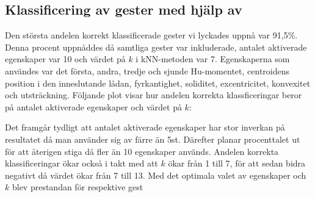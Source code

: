 \documentclass[../rapport_MVEX01-11-05]{subfiles}
\begin{document}
\subsection{Klassificering av gester med hjälp av \knn}
Den största andelen korrekt klassificerade gester vi lyckades uppnå var 91,5\%.
Denna procent uppnåddes då samtliga gester var inkluderade, antalet aktiverade
egenskaper var 10 och värdet på $k$ i kNN-metoden var 7. Egenskaperna som
användes var det första, andra, tredje och sjunde Hu-momentet, centroidens
position i den inneslutande lådan, fyrkantighet, soliditet, excentricitet,
konvexitet och utsträckning. Följande plot visar hur andelen korrekta
klassficeringar beror på antalet aktiverade egenskaper och värdet på $k$:


Det framgår tydligt att antalet aktiverade egenskaper har stor
inverkan på resultatet då man använder sig av färre än
5st. Därefter planar procenttalet ut för att återigen stiga då
fler än 10 egenskaper används. Andelen korrekta klassificeringar
ökar också i takt med att $k$ ökar från 1 till 7, för att sedan
bidra negativt då värdet ökar från 7 till 13. Med det optimala
valet av egenskaper och $k$ blev prestandan för respektive gest




\subsection{\knn}
\end{document}
